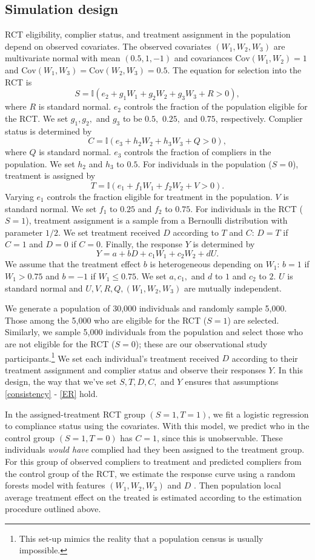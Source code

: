 \documentclass[12pt]{article}
\newcommand{\ind}{\mathbb{I}} %
\newcommand{\cov}{\mathrm{Cov}}
\begin{document}
\subsection{Simulation design}
RCT eligibility, complier status, and treatment assignment in the population depend on observed covariates. 
The observed covariates $(W_1, W_2, W_3)$ are multivariate normal with mean $(0.5, 1, -1)$ and covariances $\cov(W_1, W_2) = 1$ and $\cov(W_1, W_3) = \cov(W_2, W_3) = 0.5$. 
 The  equation for selection into the RCT is
 $$ S = \ind(e_2 + g_1W_1 + g_2W_2 + g_3W_3 + R > 0),$$
  where $R$ is standard normal. $e_2$ controls the fraction of the population eligible for the RCT. We set $g_1, g_2,$ and $g_3$ to be $0.5,$ $0.25,$ and $0.75$, respectively.
Complier status is determined by
$$C = \ind(e_3 + h_2W_2 + h_3W_3 + Q > 0),$$
where $Q$ is standard normal. $e_3$ controls the fraction of compliers in the population. We set $h_2$ and $h_3$ to $0.5$.
 For individuals in the population ($S=0$),  treatment is assigned by
  $$T = \ind(e_1 + f_1W_1 + f_2W_2 + V > 0).$$
Varying $e_1$ controls the fraction eligible for treatment in the population. $V$ is standard normal. We set $f_1$ to $0.25$ and $f_2$ to $0.75$.  For individuals in the RCT ($S=1$), treatment assignment is a sample from a Bernoulli distribution with parameter $1/2$.
We set treatment received $D$ according to $T$ and $C$: $D = T$ if $C=1$ and $D = 0$ if $C=0$.
Finally, the response $Y$ is determined by 
$$Y = a + bD + c_1W_1 + c_2W_2 + dU.$$
 We assume that the treatment effect $b$ is heterogeneous depending on $W_1$: $b = 1$ if $W_1 > 0.75$ and $b=-1$ if $W_1 \leq 0.75$.   We set $a, c_1,$ and $d$ to $1$ and $c_2$ to $2$. $U$ is standard normal and $U, V, R, Q, (W_1, W_2, W_3)$ are mutually independent.
 
We generate a population of 30,000 individuals and randomly sample 5,000.  Those among the 5,000 who are eligible for the RCT ($S=1$) are selected. Similarly, we sample 5,000 individuals from the population and select those who are not eligible for the RCT ($S=0$); these are our observational study participants.\footnote{This set-up mimics the reality that a population census is usually impossible.} We set each individual's treatment received $D$ according to their treatment assignment and complier status and observe their responses $Y$.  In this design, the way that we've set $S, T, D, C,$ and $Y$ ensures that assumptions \eqref{consistency} - \eqref{ER} hold.
 
In the assigned-treatment RCT group $(S = 1, T = 1)$, we fit a logistic regression to compliance status using the covariates.  With this model, we predict who in the control group $(S = 1, T = 0)$ has $C=1$, since this is unobservable.  These individuals \textit{would have} complied had they been assigned to the treatment group.  For this group of observed compliers to treatment and predicted compliers from the control group of the RCT, we estimate the response curve using a random forests model with features $(W_1, W_2, W_3)$ and $D$ \citep{breiman2001}.  Then population local average treatment effect on the treated is estimated according to the estimation procedure outlined above.
\end{document}
